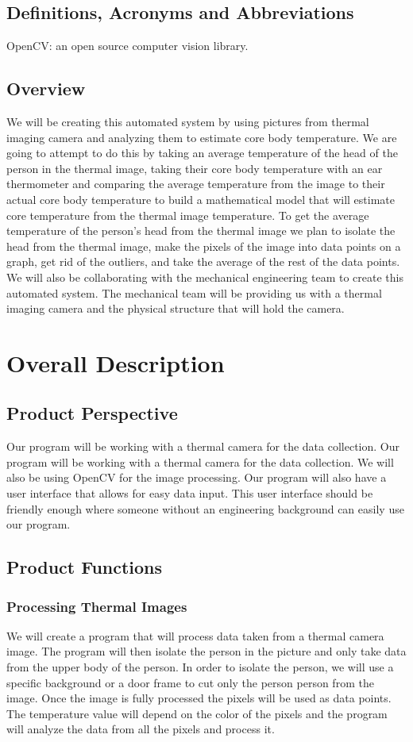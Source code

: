 \documentclass[onecolumn, draftclsnofoot,10pt, compsoc]{IEEEtran}
\begin{document}
	\subsection{Definitions, Acronyms and Abbreviations}
	    OpenCV: an open source computer vision library.

	\subsection{Overview}
	    We will be creating this automated system by using pictures from thermal imaging camera and analyzing them to estimate core body temperature. We are going to attempt to do this by taking an average temperature of the head of the person in the thermal image, taking their core body temperature with an ear thermometer and comparing the average temperature from the image to their actual core body temperature to build a mathematical model that will estimate core temperature from the thermal image temperature. To get the average temperature of the person’s head from the thermal image we plan to isolate the head from the thermal image, make the pixels of the image into data points on a graph, get rid of the outliers, and take the average of the rest of the data points. We will also be collaborating with the mechanical engineering team to create this automated system. The mechanical team will be providing us with a thermal imaging camera and the physical structure that will hold the camera.
\section{Overall Description}
	\subsection{Product Perspective}
		Our program will be working with a thermal camera for the data collection. Our program will be working with a thermal camera for the data collection. We will also be using OpenCV for the image processing. Our program will also have a user interface that allows for easy data input. This user interface should be friendly enough where someone without an engineering background can easily use our program. 
	\subsection{Product Functions}
		\subsubsection{Processing Thermal Images}
		We will create a program that will process data taken from a thermal camera image. The program will then isolate the person in the picture and only take data from the upper body of the person. In order to isolate the person, we will use a specific background or a door frame to cut only the person person from the image. Once the image is fully processed the pixels will be used as data points. The temperature value will depend on the color of the pixels and the program will analyze the data from all the pixels and process it. 
\end{document}
